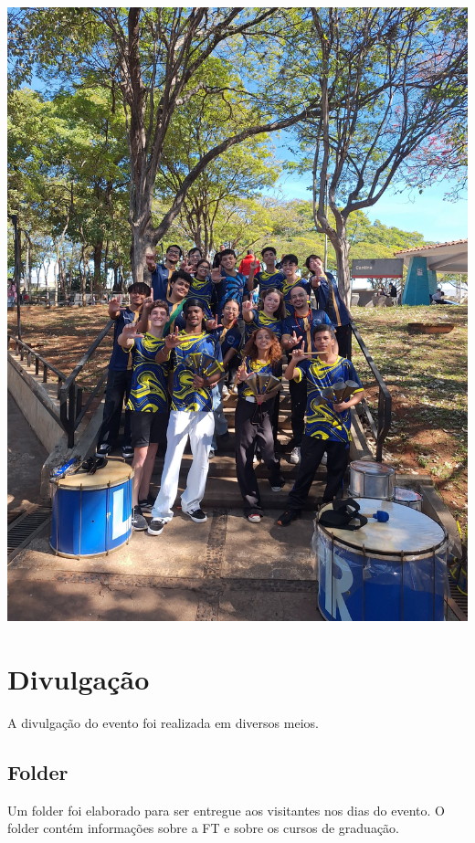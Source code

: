 \documentclass[
  letterpaper,
  DIV=11,
  numbers=noendperiod]{scrreprt}
\begin{document}
\includegraphics[width=0.7\linewidth,height=\textheight,keepaspectratio]{planejamento/limeteria.jpg}

\section{Divulgação}\label{divulgauxe7uxe3o}

A divulgação do evento foi realizada em diversos meios.

\subsection{Folder}\label{folder}

Um folder foi elaborado para ser entregue aos visitantes nos dias do
evento. O folder contém informações sobre a FT e sobre os cursos de
graduação.
\end{document}
